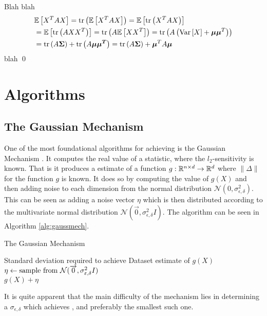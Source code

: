 \documentclass[a4paper,12pt]{article}
\newcommand{\Desc}[2]{\State \makebox[6em][l]{#1}#2}
\renewenvironment{proof}{{\textit{Proof} \\}}{\qed}
\begin{document}
\begin{proof}
Blah blah
\begin{align*}
    &\Exp{X^T A X} 
    =\text{tr}\lr{\Exp{X^T A X}} 
    =\Exp{\text{tr} \lr{X^T A X}} \\
    &= \Exp{\text{tr} \lr{A X X^T}}
    = \text{tr} \lr{A \Exp{X X^T}} 
    = \text{tr} \lr{A \lr{ \var{X} + \bm{\mu} \bm{\mu}^T}} \\
    &= \text{tr} \lr{A \bm{\Sigma}} + \text{tr} \lr{A \bm{\mu \mu^T}}
    = \text{tr} \lr{A \bm{\Sigma}} + \bm{\mu}^T A \bm{\mu}
\end{align*}
blah
\end{proof}


\section{Algorithms}
\subsection{The Gaussian Mechanism}
One of the most foundational algorithms for achieving 
\edp is the Gaussian Mechanism \cite{dpbasic}. It computes the real
value of a statistic, where the $l_2$-sensitivity is known.
That is it produces a \edp estimate of a function 
$g: \R^{n \times d} \rightarrow \R^{d}$ where $ \| \Delta \|$ 
for the function $g$ is known.
It does so by computing the value of $g(X)$ and then adding noise
to each dimension from the normal distribution 
$\mathcal{N}(0, \sigma_{\epsilon,\delta}^2)$.
This can be seen as adding a noise vector $\eta$ which 
is then distributed according to
the multivariate normal distribution 
$\mathcal{N}(\overrightarrow{0}, \sigma_{\epsilon,\delta}^2I)$. 
The algorithm can be seen in Algorithm \ref{alg:gaussmech}.

\begin{algorithm}
\caption{The Gaussian Mechanism}\label{alg:gaussmech}
\begin{algorithmic}
    \Input
    \Desc{$\sigma_{\epsilon,\delta}$}{Standard deviation required to achieve \edp}
    \Desc{$X \in \R^{n \times d}$}{Dataset}
    \EndInput
    \Output
    \State\edp estimate of $g(X)$
    \EndOutput
    \State$\eta \gets \textnormal{sample from } \mathcal{N}(\overrightarrow{0}, \sigma_{\epsilon,\delta}^2I)$ \\
    \Return$g(X) + \eta$
\end{algorithmic}
\end{algorithm}
It is quite apparent that the main difficulty of the mechanism 
lies in determining a $\sigma_{\epsilon, \delta}$ which achieves
\edp, and preferably the smallest such one.
\end{document}
